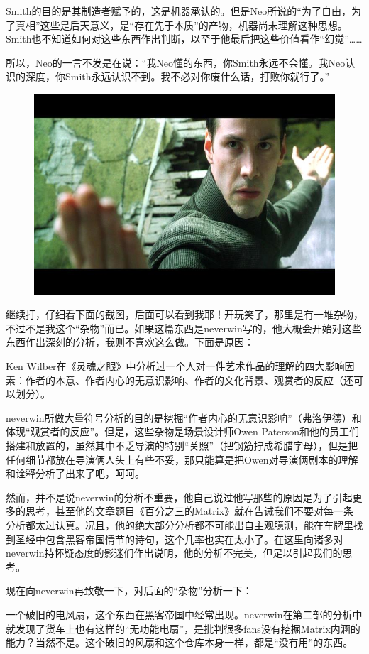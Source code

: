 \documentclass[UTF8]{ctexart}
\begin{document}
Smith的目的是其制造者赋予的，这是机器承认的。但是Neo所说的“为了自由，为了真相”这些是后天意义，是“存在先于本质”的产物，机器尚未理解这种思想。Smith也不知道如何对这些东西作出判断，以至于他最后把这些价值看作“幻觉”……

所以，Neo的一言不发是在说：“我Neo懂的东西，你Smith永远不会懂。我Neo认识的深度，你Smith永远认识不到。我不必对你废什么话，打败你就行了。”

\begin{figure}[htb]
\centering
\includegraphics[width=0.5\linewidth]{fig/fe020d33a38271fa1b4cff4f.jpg}
\end{figure}

继续打，仔细看下面的截图，后面可以看到我耶！开玩笑了，那里是有一堆杂物，不过不是我这个“杂物”而已。如果这篇东西是neverwin写的，他大概会开始对这些东西作出深刻的分析，我则不喜欢这么做。下面是原因：

Ken Wilber在《灵魂之眼》中分析过一个人对一件艺术作品的理解的四大影响因素：作者的本意、作者内心的无意识影响、作者的文化背景、观赏者的反应（还可以划分）。

neverwin所做大量符号分析的目的是挖掘“作者内心的无意识影响”（弗洛伊德）和体现“观赏者的反应”。但是，这些杂物是场景设计师Owen Paterson和他的员工们搭建和放置的，虽然其中不乏导演的特别“关照”（把钢筋拧成希腊字母），但是把任何细节都放在导演俩人头上有些不妥，那只能算是把Owen对导演俩剧本的理解和诠释分析了出来了吧，呵呵。

然而，并不是说neverwin的分析不重要，他自己说过他写那些的原因是为了引起更多的思考，甚至他的文章题目《百分之三的Matrix》就在告诫我们不要对每一条分析都太过认真。况且，他的绝大部分分析都不可能出自主观臆测，能在车牌里找到圣经中包含黑客帝国情节的诗句，这个几率也实在太小了。在这里向诸多对neverwin持怀疑态度的影迷们作出说明，他的分析不完美，但足以引起我们的思考。

现在向neverwin再致敬一下，对后面的“杂物”分析一下：

一个破旧的电风扇，这个东西在黑客帝国中经常出现。neverwin在第二部的分析中就发现了货车上也有这样的“无功能电扇”，是批判很多fans没有挖掘Matrix内涵的能力？当然不是。这个破旧的风扇和这个仓库本身一样，都是“没有用”的东西。
\end{document}

